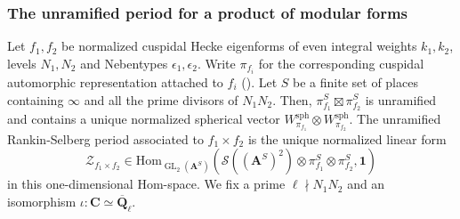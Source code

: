 \documentclass{amsart}%
\theoremstyle{plain}
\theoremstyle{plain}
\theoremstyle{remark}
\DeclareMathOperator{\GL}{GL}
\begin{document}
\subsubsection{The unramified period for a product of modular forms}
Let $f_1,f_2$ be normalized cuspidal Hecke eigenforms of even integral weights $k_1,k_2$, levels $N_1,N_2$ and Nebentypes $\epsilon_1,\epsilon_2$. Write $\pi_{f_i}$ for the corresponding cuspidal automorphic representation attached to $f_i$ (\cite{gelbart2006automorphic}). Let $S$ be a finite set of places containing $\infty$ and all the prime divisors of $N_1N_2$. Then, $\pi_{f_1}^S\boxtimes\pi_{f_2}^S$ is unramified and contains a unique normalized spherical vector $W_{\pi_{f_1}}^\mathrm{sph}\otimes W_{\pi_{f_2}}^\mathrm{sph}$. The unramified Rankin-Selberg period associated to $f_1\times f_2$ is the unique normalized linear form
 $$\mathcal{Z}_{f_1\times f_2}\in\mathrm{Hom}_{\GL_2(\mathbf{A}^S)}\left(\mathcal{S}((\mathbf{A}^S)^2)\otimes \pi_{f_1}^S\otimes\pi_{f_2}^S,\mathbf{1}\right)$$
 in this one-dimensional Hom-space.
 We fix a prime $\ell\nmid N_1N_2$ and an isomorphism $\iota:\mathbf{C}\simeq \overline{\mathbf{Q}}_\ell$.  
\end{document}

